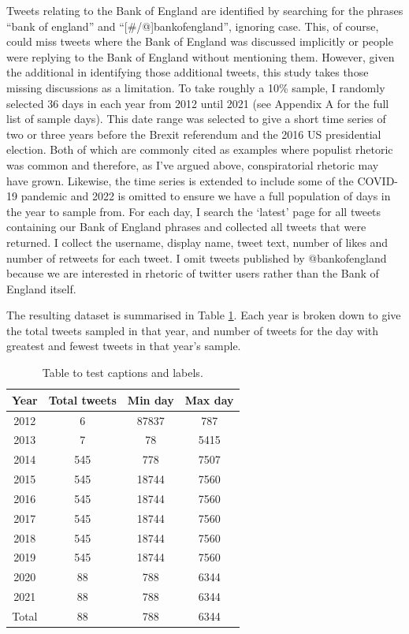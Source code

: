 \documentclass[11pt]{article}
\begin{document}
Tweets relating to the Bank of England are identified by searching for the phrases ``bank of england'' and ``[\#/@]bankofengland'', ignoring case. This, of course, could miss tweets where the Bank of England was discussed implicitly or people were replying to the Bank of England without mentioning them. However, given the additional in identifying those additional tweets, this study takes those missing discussions as a limitation. To take roughly a 10\% sample, I randomly selected 36 days in each year from 2012 until 2021 (see Appendix A for the full list of sample days). This date range was selected to give a short time series of two or three years before the Brexit referendum and the 2016 US presidential election. Both of which are commonly cited as examples where populist rhetoric was common and therefore, as I've argued above, conspiratorial rhetoric may have grown. Likewise, the time series is extended to include some of the COVID-19 pandemic and 2022 is omitted to ensure we have a full population of days in the year to sample from. For each day, I search the `latest' page for all tweets containing our Bank of England phrases and collected all tweets that were returned. I collect the username, display name, tweet text, number of likes and number of retweets for each tweet. I omit tweets published by @bankofengland because we are interested in rhetoric of twitter users rather than the Bank of England itself.

The resulting dataset is summarised in Table \ref{table: basic frequency}. Each year is broken down to give the total tweets sampled in that year, and number of tweets for the day with greatest and fewest tweets in that year's sample.

\begin{table}[h!]
\centering
\begin{tabular}{||c c c c||} 
 \hline
 Year & Total tweets & Min day & Max day \\ [0.5ex] 
 \hline\hline
 2012 & 6 & 87837 & 787 \\ 
 2013 & 7 & 78 & 5415 \\
 2014 & 545 & 778 & 7507 \\
 2015 & 545 & 18744 & 7560 \\
 2016 & 545 & 18744 & 7560 \\
 2017 & 545 & 18744 & 7560 \\
 2018 & 545 & 18744 & 7560 \\
 2019 & 545 & 18744 & 7560 \\
 2020 & 88 & 788 & 6344 \\ 
 2021 & 88 & 788 & 6344 \\ [0.5ex] 
 \hline\hline
 Total & 88 & 788 & 6344 \\ [1ex] 
 \hline
\end{tabular}
\caption{Table to test captions and labels.}
\label{table: basic frequency}
\end{table}
\end{document}
